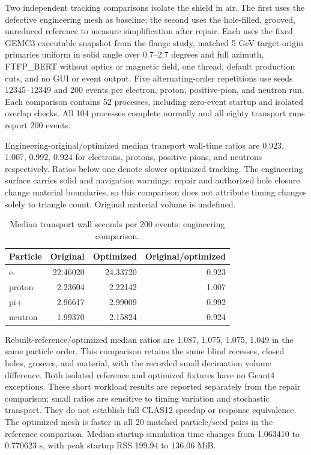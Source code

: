 Two independent tracking comparisons isolate the shield in air. The first uses the defective engineering
mesh as baseline; the second uses the hole-filled, grooved, unreduced reference to measure simplification
after repair. Each uses the fixed GEMC3 executable snapshot from the flange study, matched 5 GeV
target-origin primaries uniform in solid angle over 0.7--2.7 degrees and full azimuth, FTFP\_BERT without
optics or magnetic field, one thread, default production cuts, and no GUI or event output. Five
alternating-order repetitions use seeds 12345--12349 and 200 events per electron, proton, positive-pion, and
neutron run. Each comparison contains 52 processes, including zero-event startup and isolated overlap
checks. All 104 processes complete normally and all eighty transport runs report 200 events.

Engineering-original/optimized median transport wall-time ratios are 0.923, 1.007, 0.992, 0.924 for
electrons, protons, positive pions, and neutrons respectively. Ratios below one denote slower optimized
tracking. The engineering surface carries solid and navigation warnings; repair and authorized hole closure
change material boundaries, so this comparison does not attribute timing changes solely to triangle count.
Original material volume is undefined.

\begin{table}[htbp]
\centering
\caption{Median transport wall seconds per 200 events: engineering comparison.}
\label{tab:ft-shield-engineering}
\begin{tabular}{lrrr}
\toprule
Particle & Original & Optimized & Original/optimized \\
\midrule
e- & 22.46020 & 24.33720 & 0.923 \\
proton & 2.23604 & 2.22142 & 1.007 \\
pi+ & 2.96617 & 2.99009 & 0.992 \\
neutron & 1.99370 & 2.15824 & 0.924 \\
\bottomrule
\end{tabular}
\end{table}

Rebuilt-reference/optimized median ratios are 1.087, 1.075, 1.075, 1.049 in the same particle order. This
comparison retains the same blind recesses, closed holes, grooves, and material, with the recorded small
decimation volume difference. Both isolated reference and optimized fixtures have no Geant4 exceptions.
These short workload results are reported separately from the repair comparison; small ratios are sensitive
to timing variation and stochastic transport. They do not establish full CLAS12 speedup or response
equivalence. The optimized mesh is faster in all 20 matched particle/seed pairs in the reference comparison.
Median startup simulation time changes from 1.063410 to 0.770623 s, with peak startup RSS 199.94 to 136.06
MiB.

